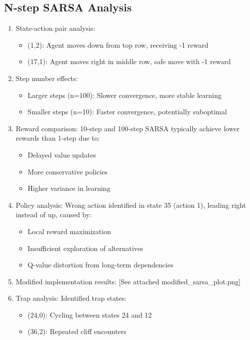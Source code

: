 \documentclass{article}
\begin{document}
\subsection{N-step SARSA Analysis}
\begin{enumerate}[label=(\arabic*)]
\item State-action pair analysis:
\begin{itemize}
    \item (1,2): Agent moves down from top row, receiving -1 reward
    \item (17,1): Agent moves right in middle row, safe move with -1 reward
\end{itemize}

\item Step number effects:
\begin{itemize}
    \item Larger steps (n=100): Slower convergence, more stable learning
    \item Smaller steps (n=10): Faster convergence, potentially suboptimal
\end{itemize}

\item Reward comparison:
10-step and 100-step SARSA typically achieve lower rewards than 1-step due to:
\begin{itemize}
    \item Delayed value updates
    \item More conservative policies
    \item Higher variance in learning
\end{itemize}

\item Policy analysis:
Wrong action identified in state 35 (action 1), leading right instead of up, caused by:
\begin{itemize}
    \item Local reward maximization
    \item Insufficient exploration of alternatives
    \item Q-value distortion from long-term dependencies
\end{itemize}

\item Modified implementation results: [See attached modified\_sarsa\_plot.png]

\item Trap analysis:
Identified trap states:
\begin{itemize}
    \item (24,0): Cycling between states 24 and 12
    \item (36,2): Repeated cliff encounters
\end{itemize}
\end{enumerate}
\end{document}
